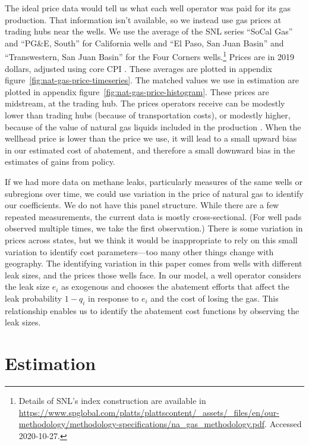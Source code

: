 \documentclass[12pt,oneside,letterpaper]{article}
\theoremstyle{definition}
\begin{document}
\begin{refsection}
The ideal price data would tell us what each well operator was paid for its gas production.
That information isn't available, so we instead use gas prices at trading hubs near the wells.
We use the average of the \gls{SNL} series ``SoCal Gas'' and ``PG\&E, South'' for California wells and
``El Paso, San Juan Basin'' and ``Transwestern, San Juan Basin'' for the Four Corners wells.\footnote{%
Details of SNL's index construction are available in \url{https://www.spglobal.com/platts/plattscontent/_assets/_files/en/our-methodology/methodology-specifications/na_gas_methodology.pdf}.
Accessed 2020-10-27.}
Prices are in 2019 dollars, adjusted using core CPI \parencite{fred_cpi}.
These averages are plotted in appendix figure~\ref{fig:nat-gas-price-timeseries}.
The matched values we use in estimation are plotted in appendix figure~\ref{fig:nat-gas-price-histogram}.
These prices are midstream, at the trading hub.
The  prices operators receive can be modestly lower than trading hubs (because of transportation costs), or modestly higher, because of the value of natural gas liquids included in the production
\parencite{Agerton/Gilbert/Upton:2023}.
When the wellhead price is lower than the price we use, it will lead to a small upward bias in our estimated cost of abatement, and therefore a small downward bias in the estimates of gains from policy.


If we had more data on methane leaks, particularly measures of the same wells or subregions over time, we could use variation in the price of natural gas to identify our coefficients.
We do not have this panel structure.
While there are a few repeated measurements, the current data is mostly cross-sectional.
(For well pads observed multiple times, we take the first observation.)
There is some variation in prices across states, but we think it would be inappropriate to rely on this small variation to identify cost parameters---too many other things change with geography.
The identifying variation in this paper comes from wells with different leak sizes, and the prices those wells face.
In our model, a well operator considers the leak size \(e_i\) as exogenous and chooses the abatement efforts that affect the leak probability \(1 - q_i\) in response to \(e_i\) and the cost of losing the gas.
This relationship enables us to identify the abatement cost functions by observing the leak sizes.



\section{Estimation}
\label{sec:estimation}


\end{refsection}
\end{document}
